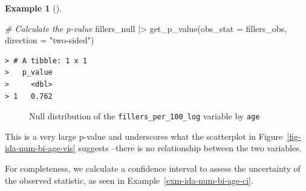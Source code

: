 \documentclass[
  letterpaper,
  DIV=11,
  numbers=noendperiod]{scrreprt}
\newenvironment{Shaded}{\begin{snugshade}}{\end{snugshade}}
\newcommand{\AttributeTok}[1]{\textcolor[rgb]{0.00,0.00,0.00}{#1}}
\newcommand{\CommentTok}[1]{\textcolor[rgb]{0.00,0.00,0.00}{\textit{#1}}}
\newcommand{\FunctionTok}[1]{\textcolor[rgb]{0.00,0.00,0.00}{#1}}
\newcommand{\NormalTok}[1]{\textcolor[rgb]{0.00,0.00,0.00}{#1}}
\newcommand{\SpecialCharTok}[1]{\textcolor[rgb]{0.00,0.00,0.00}{#1}}
\newcommand{\StringTok}[1]{\textcolor[rgb]{0.00,0.00,0.00}{#1}}
\theoremstyle{definition}
\newtheorem{example}{Example}[chapter]
\theoremstyle{remark}
\begin{document}
\begin{example}[]
\begin{Shaded}
\begin{Highlighting}[]
\CommentTok{\# Calculate the p{-}value}
\NormalTok{fillers\_null }\SpecialCharTok{|\textgreater{}}
  \FunctionTok{get\_p\_value}\NormalTok{(}\AttributeTok{obs\_stat =}\NormalTok{ fillers\_obs, }\AttributeTok{direction =} \StringTok{"two{-}sided"}\NormalTok{)}
\end{Highlighting}
\end{Shaded}

\begin{verbatim}
> # A tibble: 1 x 1
>   p_value
>     <dbl>
> 1   0.762
\end{verbatim}

\begin{figure}[H]


\caption{\label{fig-ida-num-bi-age-null}Null distribution of the
\texttt{fillers\_per\_100\_log} variable by \texttt{age}}

\end{figure}%

\end{example}

This is a very large p-value and underscores what the scatterplot in
Figure~\ref{fig-ida-num-bi-age-vis} suggests --there is no relationship
between the two variables.

For completeness, we calculate a confidence interval to assess the
uncertainty of the observed statistic, as seen in
Example~\ref{exm-ida-num-bi-age-ci}.
\end{document}
